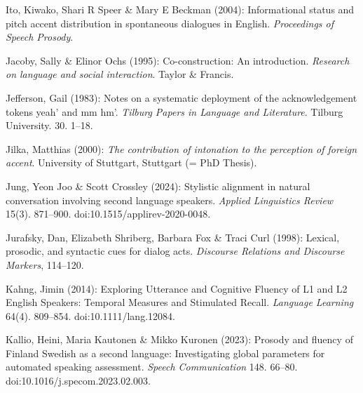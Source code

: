 \begin{styleBibliography}
Ito, Kiwako, Shari R Speer \& Mary E Beckman (2004): Informational status and pitch accent distribution in spontaneous dialogues in English. \textit{Proceedings of Speech Prosody}.
\end{styleBibliography}

\begin{styleBibliography}
Jacoby, Sally \& Elinor Ochs (1995): Co-construction: An introduction. \textit{Research on language and social interaction}. Taylor \& Francis.
\end{styleBibliography}

\begin{styleBibliography}
Jefferson, Gail (1983): Notes on a systematic deployment of the acknowledgement tokens {\textasciigrave}yeah’ and {\textasciigrave}mm hm’. \textit{Tilburg Papers in Language and Literature}. Tilburg University. 30. 1–18.
\end{styleBibliography}

\begin{styleBibliography}
Jilka, Matthias (2000): \textit{The contribution of intonation to the perception of foreign accent}. University of Stuttgart, Stuttgart (= PhD Thesis).
\end{styleBibliography}

\begin{styleBibliography}
Jung, Yeon Joo \& Scott Crossley (2024): Stylistic alignment in natural conversation involving second language speakers. \textit{Applied Linguistics Review} 15(3). 871–900. doi:10.1515/applirev-2020-0048.
\end{styleBibliography}

\begin{styleBibliography}
Jurafsky, Dan, Elizabeth Shriberg, Barbara Fox \& Traci Curl (1998): Lexical, prosodic, and syntactic cues for dialog acts. \textit{Discourse Relations and Discourse Markers}, 114–120.
\end{styleBibliography}

\begin{styleBibliography}
Kahng, Jimin (2014): Exploring Utterance and Cognitive Fluency of L1 and L2 English Speakers: Temporal Measures and Stimulated Recall. \textit{Language Learning} 64(4). 809–854. doi:10.1111/lang.12084.
\end{styleBibliography}

\begin{styleBibliography}
Kallio, Heini, Maria Kautonen \& Mikko Kuronen (2023): Prosody and fluency of Finland Swedish as a second language: Investigating global parameters for automated speaking assessment. \textit{Speech Communication} 148. 66–80. doi:10.1016/j.specom.2023.02.003.
\end{styleBibliography}

